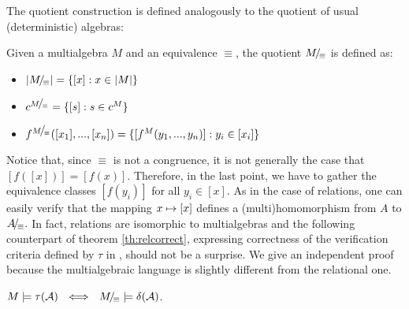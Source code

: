 The quotient construction is defined analogously to the quotient of usual (deterministic) algebras:
\begin{DEFINITION}\label{de:multquot}
Given a multialgebra $M$ and an equivalence $\equiv$, the quotient $M\!{\textstyle /}\!_\equiv$ is defined as:
\begin{itemize}\MyLPar
\item $|M\!{\textstyle /}\!_\equiv| = \{[x] : x\in |M|\}$ \item $c^{M\!{\textstyle /}\!_\equiv} = \{[s] : s\in c^M\}$ \item $f^{M\!{\textstyle /}\!_\equiv}([x_1],...,[x_n]) = \{[f^M(y_1,...,y_n)] : y_i\in [x_i]
\}$
\end{itemize}
\end{DEFINITION}
\noindent Notice that, since $\equiv$ is not a congruence, it is not generally
the case that $[f([x])] = [f(x)]$. Therefore, in the last point, we have to gather the equivalence classes $[f(y_i)]$ for all $y_i\in [x].$ As in the case of relations, one can easily verify that the mapping $x\mathrel{\mapsto} [x]$
defines a (multi)homomorphism from $A$ to $A\!{\textstyle /}\!_\equiv.$ In fact, relations are isomorphic to multialgebras and the following 
counterpart of theorem \ref{th:relcorrect}, expressing correctness of the 
verification criteria defined by $\tau$ in , should not be a surprise.
We give an independent proof because the multialgebraic language is slightly different from the relational one.
\begin{THEOREM}\label{th:multcorrect}
$M\models \tau({\cal A})\ \ \mathrel{\Longleftrightarrow}\ \ M\!{\textstyle /}\!_\equiv\models \delta({\cal A})$. \end{THEOREM}
